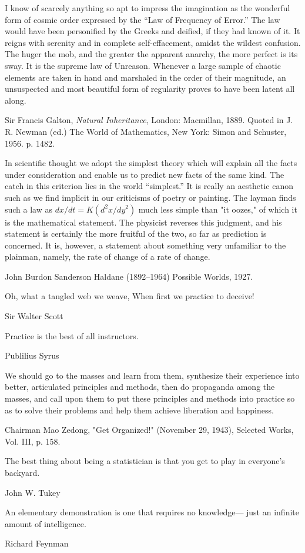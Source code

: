 \epigraph{I know of scarcely anything so apt to impress the imagination as the wonderful form of cosmic order expressed by the ``Law of Frequency of Error.'' The law would have been personified by the Greeks and deified, if they had known of it. It reigns with serenity and in complete self-effacement, amidst the wildest confusion. The huger the mob, and the greater the apparent anarchy, the more perfect is its sway. It is the supreme law of Unreason. Whenever a large sample of chaotic elements are taken in hand and marshaled in the order of their magnitude, an unsuspected and most beautiful form of regularity proves to have been latent all along.}{Sir Francis Galton, \emph{Natural Inheritance}, London: Macmillan, 1889. Quoted in J. R. Newman (ed.) The World of Mathematics, New York: Simon and Schuster, 1956. p. 1482.}

\epigraph{In scientific thought we adopt the simplest theory which will explain all the facts under consideration and enable us to predict new facts of the same kind. The catch in this criterion lies in the world ``simplest.'' It is really an aesthetic canon such as we find implicit in our criticisms of poetry or painting. The layman finds such a law as $dx/dt = K(d^2x/dy^2)$ much less simple than "it oozes," of which it is the mathematical statement. The physicist reverses this judgment, and his statement is certainly the more fruitful of the two, so far as prediction is concerned. It is, however, a statement about something very unfamiliar to the plainman, namely, the rate of change of a rate of change.}{John Burdon Sanderson Haldane (1892--1964) Possible Worlds, 1927.}

\epigraph{Oh, what a tangled web we weave, When first we practice to deceive!}{Sir Walter Scott}

\epigraph{Practice is the best of all instructors.}{Publilius Syrus}

\epigraph{We should go to the masses and learn from them, synthesize their experience into better, articulated principles and methods, then do propaganda among the masses, and call upon them to put these principles and methods into practice so as to solve their problems and help them achieve liberation and happiness.}{Chairman Mao Zedong, "Get Organized!" (November 29, 1943), Selected Works, Vol. III, p. 158.}

\epigraph{The best thing about being a statistician is that you get to play in everyone's backyard.}{John W. Tukey}%

\epigraph{An elementary demonstration is one that requires no knowledge--- just an infinite amount of intelligence.}{Richard Feynman}


